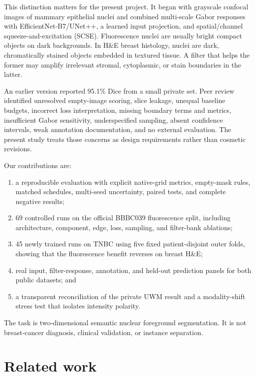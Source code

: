\documentclass{article}
\begin{document}
This distinction matters for the present project. It began with grayscale confocal images of mammary epithelial nuclei and combined multi-scale Gabor responses with EfficientNet-B7/UNet++, a learned input projection, and spatial/channel squeeze-and-excitation (SCSE). Fluorescence nuclei are usually bright compact objects on dark backgrounds. In H\&E breast histology, nuclei are dark, chromatically stained objects embedded in textured tissue. A filter that helps the former may amplify irrelevant stromal, cytoplasmic, or stain boundaries in the latter.

An earlier version reported 95.1\% Dice from a small private set. Peer review identified unresolved empty-image scoring, slice leakage, unequal baseline budgets, incorrect loss interpretation, missing boundary terms and metrics, insufficient Gabor sensitivity, underspecified sampling, absent confidence intervals, weak annotation documentation, and no external evaluation. The present study treats those concerns as design requirements rather than cosmetic revisions.

Our contributions are:
\begin{enumerate}
\item a reproducible evaluation with explicit native-grid metrics, empty-mask rules, matched schedules, multi-seed uncertainty, paired tests, and complete negative results;
\item 69 controlled runs on the official BBBC039 fluorescence split, including architecture, component, edge, loss, sampling, and filter-bank ablations;
\item 45 newly trained runs on TNBC using five fixed patient-disjoint outer folds, showing that the fluorescence benefit reverses on breast H\&E;
\item real input, filter-response, annotation, and held-out prediction panels for both public datasets; and
\item a transparent reconciliation of the private UWM result and a modality-shift stress test that isolates intensity polarity.
\end{enumerate}
The task is two-dimensional semantic nuclear foreground segmentation. It is not breast-cancer diagnosis, clinical validation, or instance separation.

\section{Related work}
\end{document}
